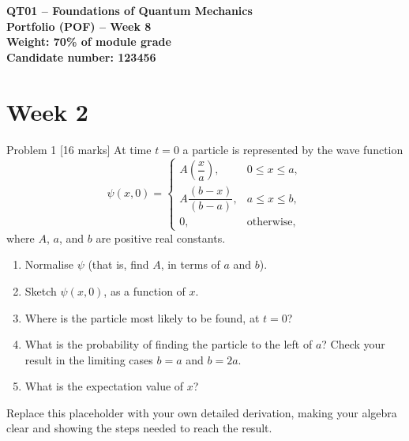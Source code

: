 \documentclass[12pt]{article}
\newif\ifsolutions
\begin{document}
\begin{center}
	{\Large\bfseries QT01 -- Foundations of Quantum Mechanics\\[0.2em]
		Portfolio (POF) -- Week 8\\[0.3em]
		{\normalsize Weight: 70\% of module grade}\\[1em]
		Candidate number: 123456  %
	}
\end{center}


\section{Week 2}

\begin{problembox}{Problem 1 \hfill [16 marks]}
At time $t=0$ a particle is represented by the wave function
\[
\psi(x,0)=
\begin{cases}
A\left(\dfrac{x}{a}\right), & 0\le x\le a,\\[0.8em]
A\dfrac{(b-x)}{(b-a)}, & a\le x\le b,\\[0.8em]
0, & \text{otherwise},
\end{cases}
\]
where $A$, $a$, and $b$ are positive real constants.

\begin{enumerate}
    \item Normalise $\psi$ (that is, find $A$, in terms of $a$ and $b$).
    \item Sketch $\psi(x,0)$, as a function of $x$.
    \item Where is the particle most likely to be found, at $t=0$?
    \item What is the probability of finding the particle to the left of $a$? Check your result in the limiting cases $b=a$ and $b=2a$.
    \item What is the expectation value of $x$?
\end{enumerate}
\end{problembox}

\ifsolutions
\begin{solutionbox}
	 Replace this placeholder with your own detailed derivation, making your algebra clear and showing the steps needed to reach the result.
\end{solutionbox}
\end{document}
